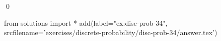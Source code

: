 
\begin{ex} 
  \label{ex:disc-prob-34}
  
  \qed
\end{ex} 
\begin{python0}
from solutions import *
add(label="ex:disc-prob-34",
    srcfilename='exercises/discrete-probability/disc-prob-34/answer.tex') 
\end{python0}
